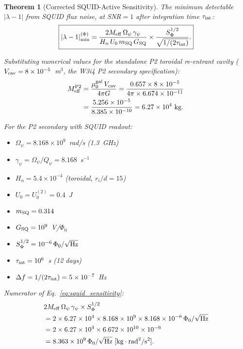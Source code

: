 \documentclass[11pt,twocolumn]{article}
\newcommand{\lam}{\lambda}
\newcommand{\Opsi}{\Omega_\psi}
\newcommand{\gpsi}{\gamma_\psi}
\newcommand{\Meff}{M_{\rm eff}}
\newcommand{\ee}[1]{\times 10^{#1}}
\newcommand{\Qpsi}{Q_\psi}
\newcommand{\Heff}{H_n}
\newcommand{\Ucav}{U_0}
\newcommand{\Vcav}{V_{\rm cav}}
\newcommand{\muG}{\mu_0^{\rm gal}}
\newtheorem{theorem}{Theorem}[section]
\theoremstyle{definition}
\theoremstyle{remark}
\begin{document}
\begin{theorem}[Corrected SQUID-Active Sensitivity]
\label{thm:squid_corrected}
The minimum detectable $|\lam-1|$ from SQUID flux noise, at SNR$=1$
after integration time $\tau_{\rm int}$:
\begin{equation}
\boxed{
|\lam-1|_{\rm min}^{(\Phi)}
= \frac{2\Meff\,\Opsi\,\gpsi}
{\Heff\,\Ucav\,m_{\rm SQ}\,G_{\rm SQ}}
\times\frac{S_\Phi^{1/2}}{\sqrt{1/(2\tau_{\rm int})}}.
}
\label{eq:squid_sensitivity}
\end{equation}

Substituting numerical values for the standalone P2 toroidal re-entrant
cavity ($\Vcav = 8\ee{-5}$~m$^3$, the W3i4 P2 secondary specification):
\begin{align}
\Meff^{\rm P2} &= \frac{\muG\,\Vcav}{4\pi G}
= \frac{0.657\times 8\ee{-5}}{4\pi\times6.674\ee{-11}}
\nonumber\\
&= \frac{5.256\ee{-5}}{8.385\ee{-10}}
= 6.27\ee{4}~\text{kg}.
\label{eq:Meff_P2}
\end{align}

For the P2 secondary with SQUID readout:
\begin{itemize}[nosep]
\item $\Opsi = 8.168\ee{9}$~rad/s (1.3~GHz)
\item $\gpsi = \Opsi/\Qpsi = 8.168$~s$^{-1}$
\item $\Heff = 5.4\ee{-4}$ (toroidal, $r_i/d = 15$)
\item $\Ucav = U_0^{(2)} = 0.4$~J
\item $m_{\rm SQ} = 0.314$
\item $G_{\rm SQ} = 10^9$~V/$\Phi_0$
\item $S_\Phi^{1/2} = 10^{-6}\,\Phi_0/\sqrt{\rm Hz}$
\item $\tau_{\rm int} = 10^6$~s (12 days)
\item $\Delta f = 1/(2\tau_{\rm int}) = 5\ee{-7}$~Hz
\end{itemize}

Numerator of Eq.~\eqref{eq:squid_sensitivity}:
\begin{align}
&2\Meff\,\Opsi\,\gpsi \times S_\Phi^{1/2}
\nonumber\\
&= 2\times 6.27\ee{4}\times 8.168\ee{9}\times 8.168
\times 10^{-6}\,\Phi_0/\sqrt{\rm Hz}
\nonumber\\
&= 2\times 6.27\ee{4}\times 6.672\ee{10}\times 10^{-6}
\nonumber\\
&= 8.363\ee{9}\,\Phi_0/\sqrt{\rm Hz}~[\text{kg}\cdot\text{rad}^2/\text{s}^2].
\label{eq:numerator}
\end{align}


\end{theorem}
\end{document}
